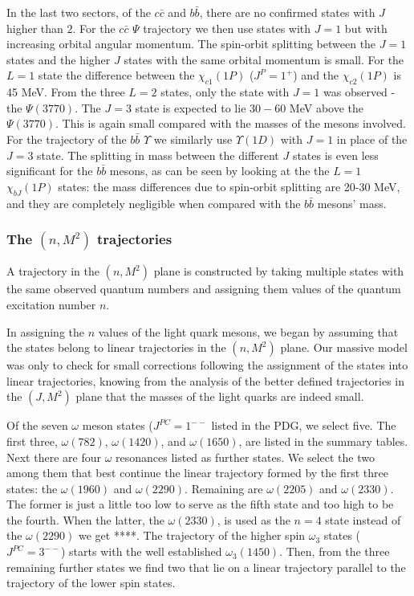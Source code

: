 \documentclass[11pt,a4]{article}
\newcommand{\ccb}{c\bar{c}}
\newcommand{\bbb}{b\bar{b}}
\begin{document}
In the last two sectors, of the \(\ccb\) and \(\bbb\), there are no confirmed states with \(J\) higher than \(2\). For the \(\ccb\) \(\Psi\) trajectory we then use states with \(J = 1\) but with increasing orbital angular momentum. The spin-orbit splitting between the \(J = 1\) states and the higher \(J\) states with the same orbital momentum is small. For the \(L = 1\) state the difference between the \(\chi_{c1}(1P)\) (\(J^P = 1^+\)) and the \(\chi_{c2}(1P)\) is 45 MeV. From the three \(L = 2\) states, only the state with \(J = 1\) was observed - the \(\Psi(3770)\). The \(J = 3\) state is expected to lie \(30-60\) MeV above the \(\Psi(3770)\)\cite{Eichten:2007qx}. This is again small compared with the masses of the mesons involved. For the trajectory of the \(\bbb\) \(\Upsilon\) we similarly use \(\Upsilon(1D)\) with \(J = 1\) in place of the \(J = 3\) state. The splitting in mass between the different \(J\) states is even less significant for the \(\bbb\) mesons, as can be seen by looking at the the \(L = 1\) \(\chi_{bJ}(1P)\) states: the mass differences due to spin-orbit splitting are 20-30 MeV, and they are completely negligible when compared with the \(\bbb\) mesons' mass.

\subsubsection{The \texorpdfstring{$(n,M^2)$}{(n,M2)} trajectories}
A trajectory in the \((n,M^2)\) plane is constructed by taking multiple states with the same observed quantum numbers and assigning them values of the quantum excitation number \(n\).

In assigning the \(n\) values of the light quark mesons, we began by assuming that the states belong to linear trajectories in the \((n,M^2)\) plane. Our massive model was only to check for small corrections following the assignment of the states into linear trajectories, knowing from the analysis of the better defined trajectories in the \((J,M^2)\) plane that the masses of the light quarks are indeed small.

Of the seven \(\omega\) meson states (\(J^{PC} = 1^{--}\) listed in the PDG, we select five. The first three, \(\omega(782)\), \(\omega(1420)\), and \(\omega(1650)\), are listed in the summary tables. Next there are four \(\omega\) resonances listed as further states. We select the two among them that best continue the linear trajectory formed by the first three states: the \(\omega(1960)\) and \(\omega(2290)\). Remaining are \(\omega(2205)\) and \(\omega(2330)\). The former is just a little too low to serve as the fifth state and too high to be the fourth. When the latter, the \(\omega(2330)\), is used as the \(n = 4\) state instead of the \(\omega(2290)\) we get ****. The trajectory of the higher spin \(\omega_3\) states (\(J^{PC} = 3^{--}\)) starts with the well established \(\omega_3(1450)\). Then, from the three remaining further states we find two that lie on a linear trajectory parallel to the trajectory of the lower spin states.
\end{document}
